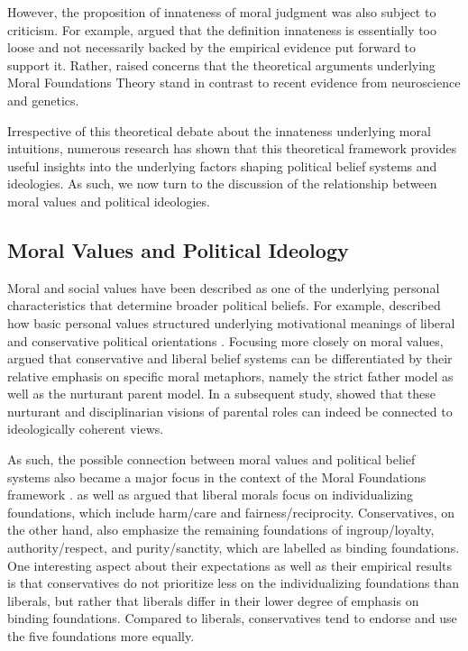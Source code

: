\documentclass[12pt]{article}
\begin{document}
However, the proposition of innateness of moral judgment was also subject to criticism. For example, \citet{suhler2011can} argued that the definition innateness is essentially too loose and not necessarily backed by the empirical evidence put forward to support it. Rather, \citet{suhler2011can} raised concerns that the theoretical arguments underlying Moral Foundations Theory stand in contrast to recent evidence from neuroscience and genetics.

Irrespective of this theoretical debate about the innateness underlying moral intuitions, numerous research has shown that this theoretical framework provides useful insights into the underlying factors shaping political belief systems and ideologies. As such, we now turn to the discussion of the relationship between moral values and political ideologies.


\subsection{Moral Values and Political Ideology}

Moral and social values have been described as one of the underlying personal characteristics that determine broader political beliefs. For example, \citet{piurko2011basic} described how basic personal values structured underlying motivational meanings of liberal and conservative political orientations \citep[see also][]{schwartz2010basic,schwartz2011basic}. Focusing more closely on moral values, \citet{lakoff1995metaphor} argued that conservative and liberal belief systems can be differentiated by their relative emphasis on specific moral metaphors, namely the strict father model as well as the nurturant parent model. In a subsequent study, \citet{barker2006competing} showed that these nurturant and disciplinarian visions of parental roles can indeed be connected to ideologically coherent views.

As such, the possible connection between moral values and political belief systems also became a major focus in the context of the Moral Foundations framework \citep[c.f.][]{haidt2012righteous}. \citet{haidt2007morality} as well as \citet{graham2009liberals} argued that liberal morals focus on individualizing foundations, which include harm/care and fairness/reciprocity. Conservatives, on the other hand, also emphasize the remaining foundations of ingroup/loyalty, authority/respect, and purity/sanctity, which are labelled as binding foundations. One interesting aspect about their expectations as well as their empirical results is that conservatives do not prioritize less on the individualizing foundations than liberals, but rather that liberals differ in their lower degree of emphasis on binding foundations. Compared to liberals, conservatives tend to endorse and use the five foundations more equally.
\end{document}
